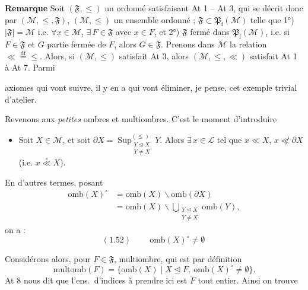 \documentclass[11pt,a4paper]{article}
\begin{document}
\textbf{Remarque} Soit $(\mathfrak{F}, \leq)$ un ordonné satisfaisant At 1 -- At 3,  qui se décrit donc par $(\mathcal{M}, \leq, \mathfrak{F})$,  $(\mathcal{M}, \leq)$ un ensemble ordonné ; $\mathfrak{F} \subset \mathfrak{P}_{\mathrm{f}}(\mathcal{M})$  telle que 1°) $|\mathfrak{F}| = \mathcal{M}$ i.e. $\forall x \in \mathcal{M}$, $\exists\, F \in \mathfrak{F}$ avec $x \in F$, et 2°) $\mathfrak{F}$ fermé dans $\mathfrak{P}_{\mathrm{f}}(\mathcal{M})$, i.e. si $F \in \mathfrak{F}$ et $G$ partie fermée de $F$, alors $G \in \mathfrak{F}$. Prenons dans $\mathcal{M}$ la relation $\ll \overset{\mathrm{df}}{=} \leq$. Alors, si $(\mathcal{M}, \leq)$ satisfait At 3, alors $(\mathcal{M}, \leq, \ll)$ satisfait At 1 à At 7. Parmi

axiomes qui vont suivre, il y en a qui vont éliminer, je pense, cet exemple trivial d'atelier.


Revenons aux \emph{petites} ombres et multiombres. C'est le moment d'introduire
\begin{itemize}
  \item[\emph{At 8}] Soit $X \in \mathcal{M}$, et soit $\partial X = \operatorname*{Sup}^{(\leq)}_{\substack{Y \trianglelefteq X \\ Y \neq X}} Y$. Alors $\exists\, x \in \mathcal{L}$ tel que $x \ll X$,  $x \not\ll \partial X$ (i.e. $x \overset{\circ}{\ll} X$). 
\end{itemize}
En d'autres termes, posant \struck{\ill{}}
\[
  \begin{aligned}
    \mathrm{omb}(X)^{\circ} &= \mathrm{omb}(X) \smallsetminus \mathrm{omb}(\partial X) \\
    &= \mathrm{omb}(X) \smallsetminus \bigcup_{\substack{Y \trianglelefteq X \\ Y \neq X}} \mathrm{omb}(Y),
  \end{aligned}
\]
on a :
\[
  (1.52) \qquad \boxed{\ \mathrm{omb}(X)^{\circ} \neq \emptyset\ }
\]

Considérons alors, pour $F \in \mathfrak{F}$,  multiombre, qui est par définition  
\[
  \mathrm{multomb}(F) = \lbrace \mathrm{omb}(X) \mid X \trianglelefteq F,\ \mathrm{omb}(X)^{\circ} \neq \emptyset \rbrace .
\]
At 8 nous dit que l'ens.\ d'indices à prendre ici est $\widetilde{F}$ tout entier.  Ainsi on trouve
\end{document}
